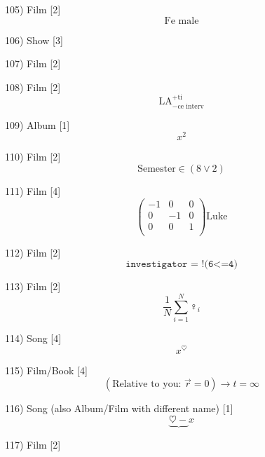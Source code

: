 \documentclass[10pt]{article}
\begin{document}
    105) Film [2]
    \[
        \text{Fe male}
    \]

    106) Show [3]
    \begin{figure}
    \end{figure}
    
    107) Film [2]
    \begin{figure}
    \end{figure}

    108) Film [2]
    \[
      \text{LA}^{+ \text{ti}}_{-\text{ce interv}}
    \]

    109) Album [1]
    \[
      x^2
    \]
    
    110) Film [2]
    \[
      \text{Semester} \in (8  \lor 2)
    \]

    111) Film [4]
    \[
        \begin{pmatrix}
          -1 & 0 & 0 \\
          0 & -1 & 0 \\
          0 & 0  & 1 \\
        \end{pmatrix}
        \text{Luke} 
    \]

    112) Film [2]
    \[
      \texttt{investigator = !(6<=4)}
    \]

    113) Film [2]
    \[
        \frac{1}{N} \sum_{i=1}^{N}\female_i
\]

    114) Song [4]
    \[
      x^\heartsuit
    \]

    115) Film/Book [4]
    \[
      (\text{Relative to you: } \vec{r}=0 ) \to t = \infty
    \]

    116) Song (also Album/Film with different name) [1]
    \[
        \underbrace{\heartsuit -} x   
    \]

    117) Film [2]
    \begin{figure}
    \end{figure}
\end{document}
